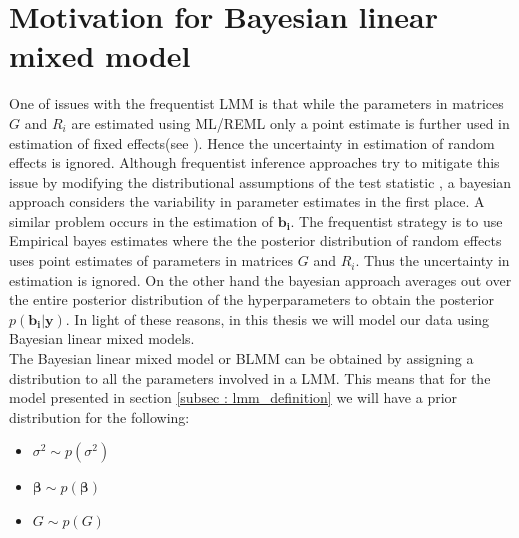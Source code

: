 \section{Motivation for Bayesian linear mixed model}
\label{sec : blmm}
One of issues with the frequentist LMM is that while the parameters in matrices $G$ and $R_i$ are estimated using ML/REML only a point estimate is further used in estimation of fixed effects(see \cite[chap. 5]{verbeke_linear_2009}). Hence the uncertainty in estimation of random effects is ignored. Although frequentist inference approaches try to mitigate this issue by modifying the distributional assumptions of the test statistic \citep[pg. 56]{verbeke_linear_2009}, a bayesian approach considers the variability in parameter estimates in the first place. A similar problem occurs in the estimation of $\boldsymbol{b_i}$. The frequentist strategy is to use Empirical bayes estimates where the the posterior distribution of random effects uses point estimates of parameters in matrices $G$ and $R_i$. Thus the uncertainty in estimation is ignored. On the other hand the bayesian approach averages out over the entire posterior distribution of the hyperparameters to obtain the posterior $p(\boldsymbol{b_i}|\boldsymbol{y})$. In light of these reasons, in this thesis we will model our data using Bayesian linear mixed models.\\

The Bayesian linear mixed model or BLMM can be obtained by assigning a distribution to all the parameters involved in a LMM. This means that for the model presented in section \ref{subsec : lmm_definition} we will have a prior distribution for the following:
\begin{itemize}
\item $\sigma^2 \sim p(\sigma^2)$
\item $\boldsymbol{\beta} \sim p(\boldsymbol{\beta})$
\item $G \sim p(G)$
\end{itemize}

